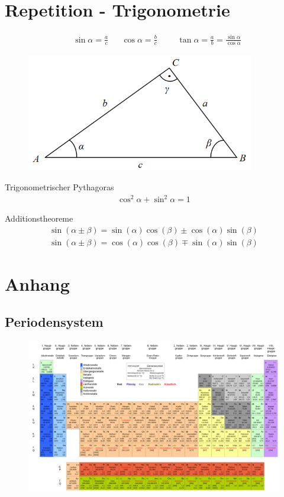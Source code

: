 \documentclass[17pt]{extarticle}
\begin{document}
\section{Repetition - Trigonometrie}
	\begin{align}
		&\sin \alpha = \frac{a}{c}
		&&\cos \alpha = \frac{b}{c}
		&&&\tan \alpha = \frac{a}{b} = \frac{\sin \alpha}{\cos \alpha}
	\end{align}
	\begin{figure}[h!]
		\centering
		\includegraphics[width=10cm]{img/Trigonometrie.png}
	\end{figure}
	
	Trigonometrischer Pythagoras
	\begin{align}
		\cos^2 \alpha + \sin^2 \alpha = 1
	\end{align}

	Additionstheoreme
	\begin{align}
		\sin(\alpha \pm \beta) = \sin(\alpha) \cos(\beta) \pm \cos(\alpha) \sin(\beta)
	\end{align}
	\begin{align}
		\sin(\alpha \pm \beta) = \cos(\alpha) \cos(\beta) \mp \sin(\alpha) \sin(\beta)
	\end{align}

\section{Anhang}
	\subsection{Periodensystem}
	\begin{figure}[h!]
		\centering
		\includegraphics[width=25cm, angle=90]{img/Periodensystem.png}
	\end{figure}
\end{document}

